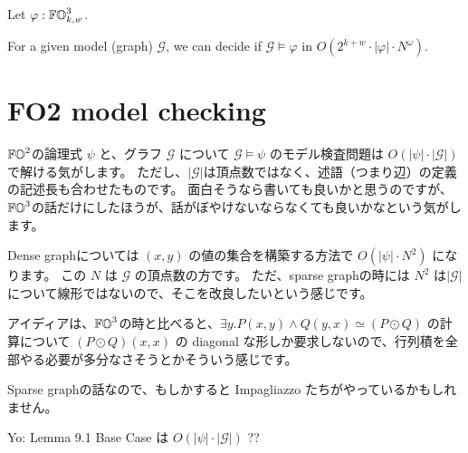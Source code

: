 
\setcounter{tempTheoremCounter}{\value{theorem}}
\begin{theorem}[Restatement]
Let $\varphi : \mathbb{FO}^3_{k, w}$.

For a given model (graph) $\mathcal{G}$,
we can decide if $\mathcal{G} \models \varphi$ in $O(2^{k+w} \cdot |\varphi| \cdot N^{\omega})$.
\end{theorem}
\setcounter{theorem}{\value{tempTheoremCounter}}

\section{FO2 model checking}

\begin{Jcomment}
    $\mathbb{FO}^2$の論理式 $\psi$ と、グラフ $\mathcal{G}$ について
    $\mathcal{G} \models \psi$ のモデル検査問題は
    $O(|\psi| \cdot |\mathcal{G}|)$ で解ける気がします。
    ただし、$|\mathcal{G}|$は頂点数ではなく、述語（つまり辺）の定義の記述長も合わせたものです。
    面白そうなら書いても良いかと思うのですが、$\mathbb{FO}^3$の話だけにしたほうが、話がぼやけないならなくても良いかなという気がします。

    Dense graphについては $(x, y)$ の値の集合を構築する方法で $O(|\psi| \cdot N^2)$ になります。
    この $N$ は $\mathcal{G}$ の頂点数の方です。
    ただ、sparse graphの時には $N^2$ は$|\mathcal{G}|$について線形ではないので、そこを改良したいという感じです。

    アイディアは、$\mathbb{FO}^3$の時と比べると、$\exists y. P(x, y) \land Q(y, x) \simeq (P \odot Q)$ の計算について $(P \odot Q)(x, x)$ の diagonal な形しか要求しないので、行列積を全部やる必要が多分なさそうとかそういう感じです。

    Sparse graphの話なので、もしかすると Impagliazzo たちがやっているかもしれません。
\end{Jcomment}

\begin{Jcomment}
    Yo:
    \cite{gaoCompletenessFirstorderProperties2018} Lemma 9.1 Base Case は $O(|\psi| \cdot |\mathcal{G}|)$ ??
\end{Jcomment}